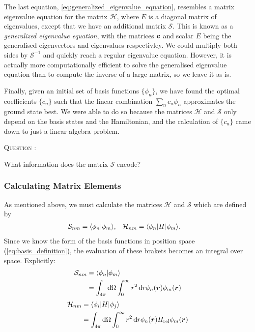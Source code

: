 \documentclass[
  a4paper,             %
  11pt,                %
  oneside,             %
  onecolumn,           %
  bibliography=totoc,  %
  final,               %
]{scrartcl}
\newcounter{question}
\newenvironment{question}{%
  \stepcounter{question}%
  \begin{tcolorbox}[
      colframe=black,
      sharp corners=all,
      boxsep=0.5ex,
    ]
    \noindent\textsc{\large Question \arabic{question}:} %
}{%
  \end{tcolorbox}%
}
\begin{document}
The last equation, \cref{eq:generalized_eigenvalue_equation}, resembles a matrix
eigenvalue equation for the matrix \(\mathcal{H}\), where \(E\) is a diagonal
matrix of eigenvalues, except that we have an additional matrix \(\mathcal{S}\).
This is known as a \emph{generalized eigenvalue equation}, with the matrices
\(\boldsymbol{c}\) and scalar \(E\) being the generalised eigenvectors and eigenvalues
respectivley.  We could multiply both sides by \(\mathcal{S}^{-1}\) and quickly
reach a regular eigenvalue equation.  However, it is actually more
computationally efficient to solve the generalised eigenvalue equation than to
compute the inverse of a large matrix, so we leave it as is.

Finally, given an initial set of basis functions \(\{\phi_{n}\}\), we have found
the optimal coefficients \(\{c_{n}\}\) such that the linear combination
\(\sum_{n} c_{n} \phi_{n}\) approximates the ground state best.  We were able to
do so because the matrices \(\mathcal{H}\) and \(\mathcal{S}\) only depend on
the basis states and the Hamiltonian, and the calculation of \(\{c_{n}\}\) came
down to just a linear algebra problem.

\begin{question}
  What information does the matrix \(\mathcal{S}\) encode?
\end{question}

\subsubsection{Calculating Matrix Elements}
\label{subsubsec:calculating_matrix_elements}

As mentioned above, we must calculate the matrices \(\mathcal{H}\) and
\(\mathcal{S}\) which are defined by
\begin{align}
  \label{eq:S_H_matrix_definition}
  \mathcal{S}_{nm} &= \braket{\phi_{n}}{\phi_{m}}, &
  \mathcal{H}_{nm} &= \brakket{\phi_{n}}{H}{\phi_{m}}.
\end{align}
Since we know the form of the basis functions in position space
(\cref{eq:basis_definition}), the evaluation of these brakets becomes an
integral over space.  Explicitly:
\begin{subequations}
  \begin{align}
    \mathcal{S}_{nm}
    &= \braket{\phi_{n}}{\phi_{m}} \\
    &= \int_{4\pi} \dd\Omega \int^{\infty}_{0} r^{2} \dd r \phi_{n}(\vt r) \phi_{m}(\vt r) \\
  \end{align}
\end{subequations}
\begin{subequations}
  \begin{align}
    \mathcal{H}_{nm}
    &= \brakket{\phi_{i}}{H}{\phi_{j}} \\
    &= \int_{4\pi} \dd\Omega \int^{\infty}_{0} r^{2} \dd r \phi_{n}(\vt r) H_{\text{rel}} \phi_{m}(\vt r) \\
  \end{align}
\end{subequations}
\end{document}
